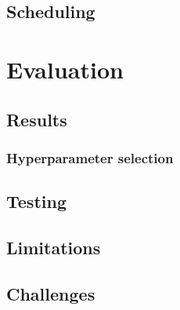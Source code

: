 \documentclass[a4paper,12pt,twoside,openright]{report}
\begin{document}







\section{Scheduling} 


\chapter{Evaluation}
 


\section{Results}

\subsection{Hyperparameter selection}


\section{Testing}
\section{Limitations}
\section{Challenges} %
\end{document}
